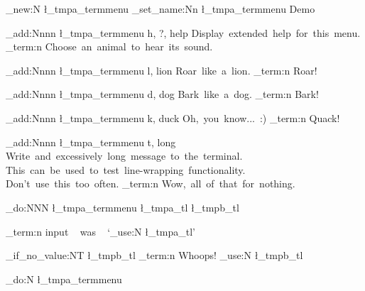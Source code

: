  \relax \ExplSyntaxOn
 \relax %

\termmenu_new:N \l_tmpa_termmenu
\termmenu_set_name:Nn \l_tmpa_termmenu { Demo }
 
\termmenu_add:Nnnn \l_tmpa_termmenu { h, ?, help }
  { Display~extended~help~for~this~menu. }
  { \msg_term:n { Choose~an~animal~to~hear~its~sound. } }
 
\termmenu_add:Nnnn \l_tmpa_termmenu { l, lion }
  { Roar~like~a~lion. }
  { \msg_term:n { Roar! } }
 
\termmenu_add:Nnnn \l_tmpa_termmenu { d, dog }
  { Bark~like~a~dog. }
  { \msg_term:n { Bark! } }
 
\termmenu_add:Nnnn \l_tmpa_termmenu { k, duck }
  { Oh,~you~know...~:) }
  { \msg_term:n { Quack! } }

\termmenu_add:Nnnn \l_tmpa_termmenu { t, long }
  {
    Write~and~excessively~long~message~to~the~terminal.~
    This~can~be~used~to~test~line-wrapping~functionality.~
    Don't~use~this~too~often.
  }
  { \msg_term:n { Wow,~all~of~that~for~nothing. } }

\termmenu_do:NNN \l_tmpa_termmenu \l_tmpa_tl \l_tmpb_tl

\msg_term:n { input ~ was ~ `\tl_use:N \l_tmpa_tl' }

\quark_if_no_value:NT \l_tmpb_tl
  { \msg_term:n { Whoops! } }
  { \tl_use:N \l_tmpb_tl }

\termmenu_do:N \l_tmpa_termmenu

\bye
